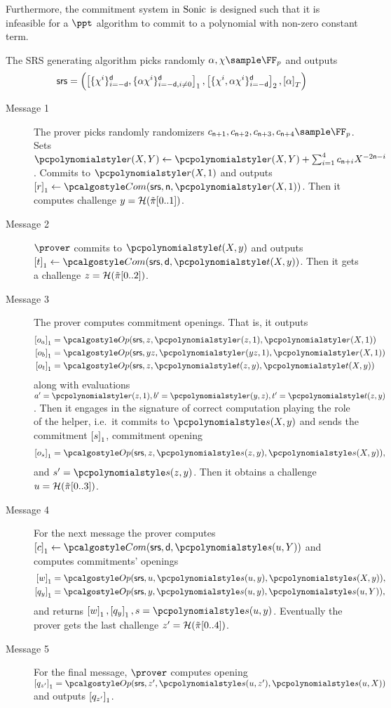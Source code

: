 Furthermore, the commitment system in ${\textnormal{{Sonic}}}$ is designed such that it is
infeasible for a $\ppt$ algorithm to commit to a polynomial with non-zero
constant term.

 The SRS generating algorithm picks
randomly $\alpha, \chi \sample \FF_p$ and outputs
	\[
      \mathsf{srs} = \left( \left[\{\chi^i\}_{i = -\mathsf{d}}^{\mathsf{d}},
          \{\alpha \chi^i\}_{i = -\mathsf{d}, i \neq 0}^{\mathsf{d}}\right]_{1},
        \left[\{\chi^i, \alpha \chi^i\}_{i = - \mathsf{d}}^{\mathsf{d}}\right]_{2},
        \left[\alpha\right]_{T} \right)
	\]
\begin{description}
\item[Message 1] The prover picks randomly randomizers
  $c_{\multconstr + 1}, c_{\multconstr + 2}, c_{\multconstr + 3}, c_{\multconstr
    + 4} \sample \FF_p$. Sets
  $\pr(X, Y) \gets \pr(X, Y) + \sum_{i = 1}^4 c_{\multconstr + i} X^{- 2
    \multconstr - i}$. Commits to $\pr(X, 1)$ and outputs
  $\gone{r} \gets \com(\srs, \multconstr, \pr(X, 1))$.  Then it computes challenge $y = \mathcal{H}(\tilde{\pi}[0..1])$.
\item[Message 2] $\prover$ commits to $\pt(X, y)$ and outputs
  $\gone{t} \gets \com(\srs, \dconst, \pt(X, y))$. Then it gets a challenge $z = \mathcal{H}(\tilde{\pi}[0..2])$.
\item[Message 3] The prover computes commitment openings. That is, it outputs
  \begin{align*}
    \gone{o_a} & = \open(\srs, z, \pr(z, 1), \pr(X, 1)) \\
    \gone{o_b} & = \open(\srs, y z, \pr(y z, 1), \pr(X, 1)) \\
    \gone{o_t} & = \open(\srs, z, \pt(z, y), \pt(X, y)) 
  \end{align*}
  along with evaluations $a' = \pr(z, 1), b' = \pr(y, z), t' = \pt(z, y)$.  Then it
  engages in the signature of correct computation playing the role of the
  helper, i.e.~it commits to $\p{s}(X, y)$ and sends the commitment $\left[s\right]_{1}$, commitment opening
  \begin{align*}
    \gone{o_s} & = \open(\srs, z, \p{s}(z, y), \p{s}(X, y)), \\
  \end{align*} and $s'=\p{s}(z, y)$. 
%
  Then
  it obtains a challenge $u = \mathcal{H}(\tilde{\pi}[0..3])$.
\item[Message 4] For the next message the prover computes
  $\gone{c} \gets \com(\srs, \dconst, \p{s}(u, Y))$ and
  computes commitments' openings
  \begin{align*}
    \gone{w} & = \open(\srs, u, \p{s}(u, y), \p{s}(X, y)), \\
    \gone{q_y} & = \open(\srs, y,\p{s}(u, y), \p{s}(u, Y)),
  \end{align*}
  and returns $\gone{w}, \gone{q_y}, s = \p{s}(u, y)$. Eventually the prover gets the last challenge
  $z' = \mathcal{H}(\tilde{\pi}[0..4])$.
\item[Message 5] For the final message, $\prover$ computes opening
  $\gone{q_{z'}} = \open(\srs, z', \p{s}(u, z'), \p{s}(u, X))$ and outputs $\left[q_{z'}\right]_{1}$.
\end{description}


